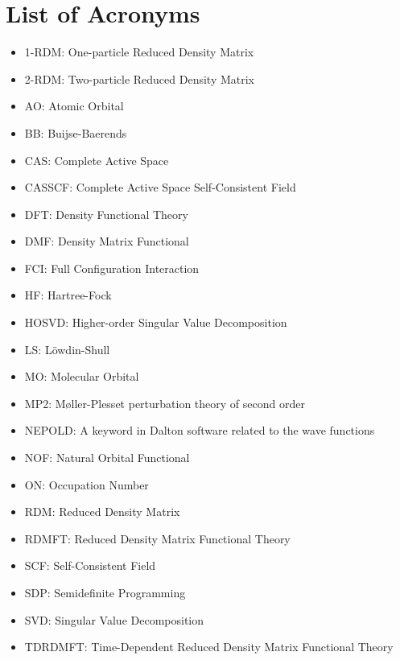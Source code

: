 \section*{List of Acronyms}

\begin{itemize}
    \item 1-RDM: One-particle Reduced Density Matrix
    \item 2-RDM: Two-particle Reduced Density Matrix
    \item AO: Atomic Orbital
    \item BB: Buijse-Baerends
    \item CAS: Complete Active Space
    \item CASSCF: Complete Active Space Self-Consistent Field
    \item DFT: Density Functional Theory
    \item DMF: Density Matrix Functional
    \item FCI: Full Configuration Interaction
    \item HF: Hartree-Fock
    \item HOSVD: Higher-order Singular Value Decomposition
    \item LS: Löwdin-Shull
    \item MO: Molecular Orbital
    \item MP2: Møller-Plesset perturbation theory of second order
    \item NEPOLD: A keyword in Dalton software related to the wave functions
    \item NOF: Natural Orbital Functional
    \item ON: Occupation Number
    \item RDM: Reduced Density Matrix
    \item RDMFT: Reduced Density Matrix Functional Theory
    \item SCF: Self-Consistent Field
    \item SDP: Semidefinite Programming
    \item SVD: Singular Value Decomposition
    \item TDRDMFT: Time-Dependent Reduced Density Matrix Functional Theory
\end{itemize}

